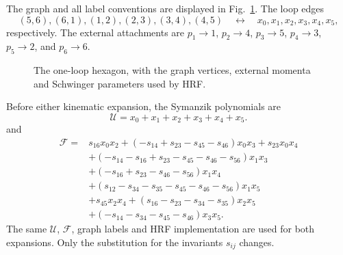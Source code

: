 \documentclass[11pt]{article}
\newcommand{\F}{\mathcal F}
\newcommand{\U}{\mathcal U}
\begin{document}
The graph and all label conventions are displayed in
Fig.~\ref{fig:one-loop-hexagon}.  The loop edges
\begin{equation}
 (5,6),(6,1),(1,2),(2,3),(3,4),(4,5)
 \quad\longleftrightarrow\quad
 x_0,x_1,x_2,x_3,x_4,x_5,
 \label{eq:hexagon-edge-map}
\end{equation}
respectively.  The external attachments are
\(p_1\to1\), \(p_2\to4\), \(p_3\to5\), \(p_4\to3\), \(p_5\to2\), and
\(p_6\to6\).

\begin{figure}[ht]
\centering
{}
\caption{The one-loop hexagon, with the graph vertices, external momenta and
Schwinger parameters used by HRF.}
\label{fig:one-loop-hexagon}
\end{figure}

Before either kinematic expansion, the Symanzik polynomials are
\begin{equation}
 \U=x_0+x_1+x_2+x_3+x_4+x_5.
\end{equation}
and
\begin{align}
\F={}&s_{16}x_0x_2
+(-s_{14}+s_{23}-s_{45}-s_{46})x_0x_3+s_{23}x_0x_4
\nonumber\\
&+(-s_{14}-s_{16}+s_{23}-s_{45}-s_{46}-s_{56})x_1x_3
\nonumber\\
&+(-s_{16}+s_{23}-s_{46}-s_{56})x_1x_4
\nonumber\\
&+(s_{12}-s_{34}-s_{35}-s_{45}-s_{46}-s_{56})x_1x_5
\nonumber\\
&+s_{45}x_2x_4+(s_{16}-s_{23}-s_{34}-s_{35})x_2x_5
\nonumber\\
&+(-s_{14}-s_{34}-s_{45}-s_{46})x_3x_5.
\label{eq:hexagon-F}
\end{align}
The same \(\U\), \(\F\), graph labels and HRF implementation are used for
both expansions.  Only the substitution for the invariants \(s_{ij}\)
changes.
\end{document}
